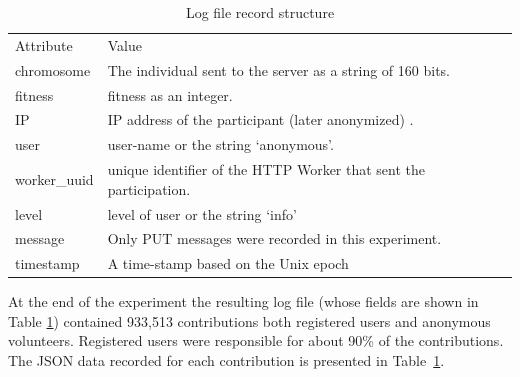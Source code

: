 \documentclass{llncs}
\begin{document}
\begin{table}[h!tbp]
  \small
  \caption{ Log file record structure}
  \label{tab:record}
  \centering
  \small
  \begin{tabular}{l  l}
    \hline\noalign{\smallskip}
    Attribute & Value \\
    \noalign{\smallskip}\hline\noalign{\smallskip}
    chromosome   & The individual sent to the server as a string of 160 bits.  \\ \hline
    fitness & fitness as an integer.  \\ \hline
    IP & IP address of the participant (later anonymized) .\\ \hline
    user & user-name or the string `anonymous'.  \\ \hline
    worker\_uuid & unique identifier of the HTTP Worker that sent the participation.   \\ \hline
    level &  level of user or the string `info' \\ \hline
    message & Only PUT messages were recorded in this experiment. \\ \hline
    timestamp & A time-stamp based on the Unix epoch\\ \hline
  \end{tabular}
\end{table}
%
At the end of the experiment the resulting log file (whose fields are shown in Table \ref{tab:record}) contained 933,513 contributions both
registered users and anonymous volunteers. Registered users were responsible for about
90\% of the contributions. %
The JSON data recorded for each contribution is  presented
in Table~\ref{tab:record}.
\end{document}
